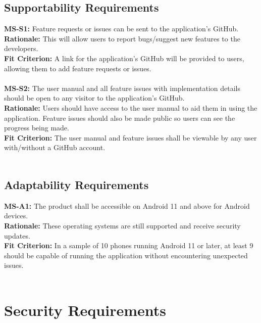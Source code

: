 \documentclass[12pt]{article}
\begin{document}
\subsection{Supportability Requirements}
  \textbf{MS-S1:} Feature requests or issues can be sent to the application's GitHub.\\
  \textbf{Rationale:} This will allow users to report bugs/suggest new features to the developers.\\
  \textbf{Fit Criterion:} A link for the application's GitHub will be provided to users, allowing them to add feature requests or issues.\\\\
  \textbf{MS-S2:} The user manual and all feature issues with implementation details should be open to any visitor to the application's GitHub.\\
  \textbf{Rationale:} Users should have access to the user manual to aid them in using the application. Feature issues should also be made public so users can see the progress being made.\\
  \textbf{Fit Criterion:} The user manual and feature issues shall be viewable by any user with/without a GitHub account.\\\\

\subsection{Adaptability Requirements}
  \textbf{MS-A1:} The product shall be accessible on Android 11 and above for Android devices.\\
  \textbf{Rationale:} These operating systems are still supported and receive security updates.\\
  \textbf{Fit Criterion:} In a sample of 10 phones running Android 11 or later, at least 9 should be capable of running the application without encountering unexpected issues.\\\\

\section{Security Requirements}
\end{document}
